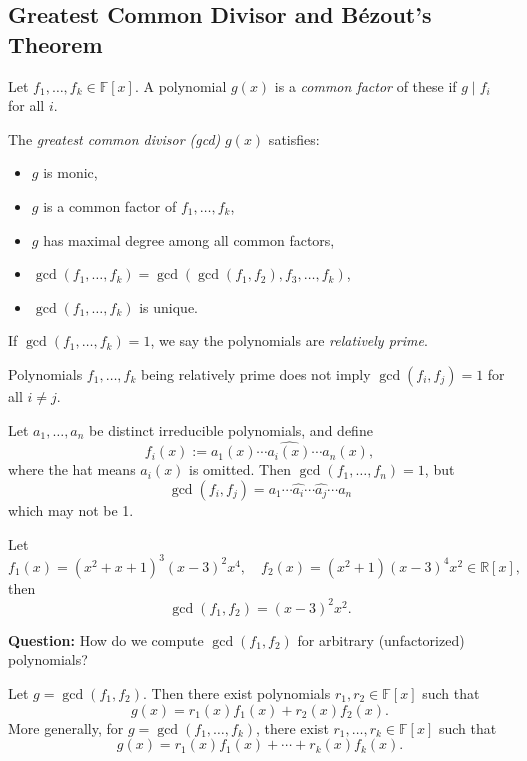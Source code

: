 \subsection{Greatest Common Divisor and B\'ezout's Theorem}
\begin{definition}
Let \(f_1, \dots, f_k \in \mathbb{F}[x]\). A polynomial \(g(x)\) is a \emph{common factor} of these if \(g \mid f_i\) for all \(i\).

The \emph{greatest common divisor (gcd)} \(g(x)\) satisfies:
\begin{itemize}
    \item \(g\) is monic,
    \item \(g\) is a common factor of \(f_1, \dots, f_k\),
    \item \(g\) has maximal degree among all common factors,
    \item \(\gcd(f_1, \dots, f_k) = \gcd(\gcd(f_1, f_2), f_3, \dots, f_k)\),
    \item \(\gcd(f_1, \dots, f_k)\) is unique.
\end{itemize}
If \(\gcd(f_1, \dots, f_k) = 1\), we say the polynomials are \emph{relatively prime}.
\end{definition}

\begin{remark}
Polynomials \(f_1, \dots, f_k\) being relatively prime does not imply \(\gcd(f_i, f_j) = 1\) for all \(i \neq j\).
\end{remark}

\begin{example}
Let \(a_1, \dots, a_n\) be distinct irreducible polynomials, and define
\[
f_i(x) := a_1(x) \cdots \widehat{a_i(x)} \cdots a_n(x),
\]
where the hat means \(a_i(x)\) is omitted. Then \(\gcd(f_1, \dots, f_n) = 1\), but
\[
\gcd(f_i, f_j) = a_1 \cdots \widehat{a_i} \cdots \widehat{a_j} \cdots a_n
\]
which may not be 1.
\end{example}

\begin{example}
Let 
\[
f_1(x) = (x^2 + x + 1)^3 (x - 3)^2 x^4, \quad
f_2(x) = (x^2 + 1)(x - 3)^4 x^2 \in \mathbb{R}[x],
\]
then
\[
\gcd(f_1, f_2) = (x - 3)^2 x^2.
\]
\end{example}


\noindent \textbf{Question: }How do we compute \(\gcd(f_1, f_2)\) for arbitrary (unfactorized) polynomials?

\begin{theorem}\label{thm:bezout}
Let \(g = \gcd(f_1, f_2)\). Then there exist polynomials \(r_1, r_2 \in \mathbb{F}[x]\) such that
\[
g(x) = r_1(x) f_1(x) + r_2(x) f_2(x).
\]
More generally, for \(g = \gcd(f_1, \ldots, f_k)\), there exist \(r_1, \ldots, r_k \in \mathbb{F}[x]\) such that
\[
g(x) = r_1(x) f_1(x) + \cdots + r_k(x) f_k(x).
\]
\end{theorem}


